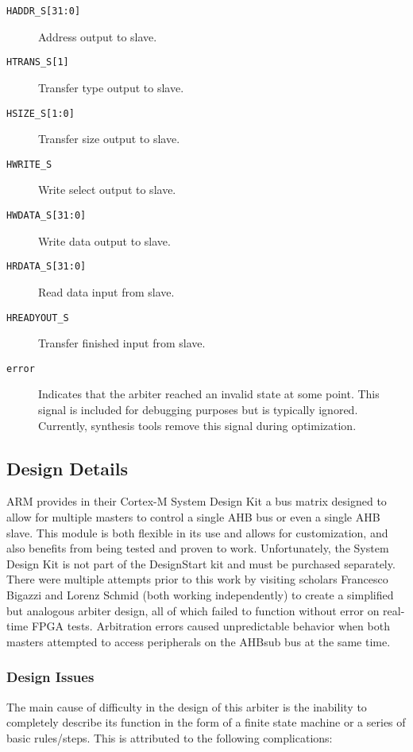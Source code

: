 \begin{description}
	\item[\texttt{HADDR\_S[31:0]}] Address output to slave.
	\item[\texttt{HTRANS\_S[1]}] Transfer type output to slave.
	\item[\texttt{HSIZE\_S[1:0]}] Transfer size output to slave.
	\item[\texttt{HWRITE\_S}] Write select output to slave.
	\item[\texttt{HWDATA\_S[31:0]}] Write data output to slave.
	\item[\texttt{HRDATA\_S[31:0]}] Read data input from slave.
	\item[\texttt{HREADYOUT\_S}] Transfer finished input from slave.
	
	\item[\texttt{error}] Indicates that the arbiter reached an invalid state at some point. This signal is included for debugging purposes but is typically ignored. Currently, synthesis tools remove this signal during optimization.
\end{description}

\subsection{Design Details}
ARM provides in their Cortex-M System Design Kit \cite{cmsdk} a bus matrix designed to allow for multiple masters to control a single AHB bus or even a single AHB slave. This module is both flexible in its use and allows for customization, and also benefits from being tested and proven to work. Unfortunately, the System Design Kit is not part of the DesignStart kit and must be purchased separately. There were multiple attempts prior to this work by visiting scholars Francesco Bigazzi and Lorenz Schmid (both working independently) to create a simplified but analogous arbiter design, all of which failed to function without error on real-time FPGA tests. Arbitration errors caused unpredictable behavior when both masters attempted to access peripherals on the AHBsub bus at the same time.

\subsubsection{Design Issues}
The main cause of difficulty in the design of this arbiter is the inability to completely describe its function in the form of a finite state machine or a series of basic rules/steps. This is attributed to the following complications:

